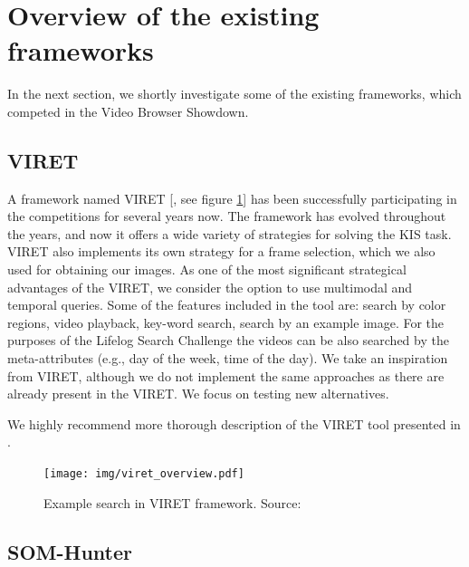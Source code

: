 \section{Overview of the existing frameworks}

In the next section, we shortly investigate some of the existing frameworks, which competed in the Video Browser Showdown. 

\subsection{VIRET}

A framework named VIRET [\cite{lokovc2019framework, lokovc2019viret}, see figure \ref{fig:viret}] has been successfully participating in the competitions for several years now. The framework has evolved throughout the years, and now it offers a wide variety of strategies for solving the KIS task. VIRET also implements its own strategy for a frame selection, which we also used for obtaining our images. As one of the most significant strategical advantages of the VIRET, we consider the option to use multimodal and temporal queries. Some of the features included in the tool are: search by color regions, video playback, key-word search, search by an example image. For the purposes of the Lifelog Search Challenge \citep{LSC20} the videos can be also searched by the meta-attributes (e.g., day of the week, time of the day). We take an inspiration from VIRET, although we do not implement the same approaches as there are already present in the VIRET. We focus on testing new alternatives.

We highly recommend more thorough description of the VIRET tool presented in \cite{kovalvcik2020viret}.

\begin{figure}
    \centering
    \texttt{[image: img/viret\_overview.pdf]}
    \caption[Example search in VIRET framework]{Example search in VIRET framework. Source: \cite{kovalvcik2020viret}}
    \label{fig:viret}
\end{figure}

\subsection{SOM-Hunter}

